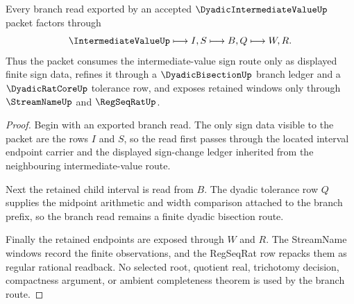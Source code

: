\begin{theorem}
\label{thm:dyadic-intermediate-value-bisection-route}
Every branch read exported by an accepted $\DyadicIntermediateValueUp$ packet factors through
$$
\IntermediateValueUp \longmapsto I,S \longmapsto B,Q \longmapsto W,R .
$$
Thus the packet consumes the intermediate-value sign route only as displayed finite sign data, refines it through a $\DyadicBisectionUp$ branch ledger and a $\DyadicRatCoreUp$ tolerance row, and exposes retained windows only through $\StreamNameUp$ and $\RegSeqRatUp$.
\end{theorem}
\begin{proof}
Begin with an exported branch read. The only sign data visible to the packet are the rows $I$ and $S$, so the read first passes through the located interval endpoint carrier and the displayed sign-change ledger inherited from the neighbouring intermediate-value route.

Next the retained child interval is read from $B$. The dyadic tolerance row $Q$ supplies the midpoint arithmetic and width comparison attached to the branch prefix, so the branch read remains a finite dyadic bisection route.

Finally the retained endpoints are exposed through $W$ and $R$. The StreamName windows record the finite observations, and the RegSeqRat row repacks them as regular rational readback. No selected root, quotient real, trichotomy decision, compactness argument, or ambient completeness theorem is used by the branch route.
\end{proof}

